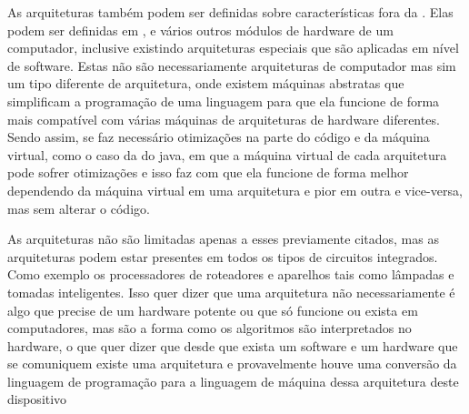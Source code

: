 \documentclass[
	12pt,				%
	openright,			%
	oneside,			%
	a4paper,			%
	english,			%
	french,				%
	spanish,			%
	brazil,				%
	]{abntex2}
\begin{document}
As arquiteturas também podem ser definidas sobre características fora da . Elas podem ser definidas em , e vários outros módulos de hardware de um computador, inclusive existindo arquiteturas especiais que são aplicadas em nível de software. Estas não são necessariamente arquiteturas de computador mas sim um tipo diferente de arquitetura, onde existem máquinas abstratas que simplificam a programação de uma linguagem para que ela funcione de forma mais compatível com várias máquinas de arquiteturas de hardware diferentes. Sendo assim, se faz necessário otimizações na parte do código e da máquina virtual, como o caso da  do java, em que a máquina virtual de cada arquitetura pode sofrer otimizações e isso faz com que ela funcione de forma melhor dependendo da máquina virtual em uma arquitetura e pior em outra e vice-versa, mas sem alterar o código.\newline

As arquiteturas não são limitadas apenas a esses previamente citados, mas as arquiteturas podem estar presentes em todos os tipos de circuitos integrados. Como exemplo os processadores de roteadores e aparelhos  tais como lâmpadas e tomadas inteligentes. Isso quer dizer que uma arquitetura não necessariamente é algo que precise de um hardware potente ou que só funcione ou exista em computadores, mas são a forma como os algoritmos são interpretados no hardware, o que quer dizer que desde que exista um software e um hardware que se comuniquem existe uma arquitetura e provavelmente houve uma conversão da linguagem de programação para a linguagem de máquina dessa arquitetura deste dispositivo\newline
\end{document}
